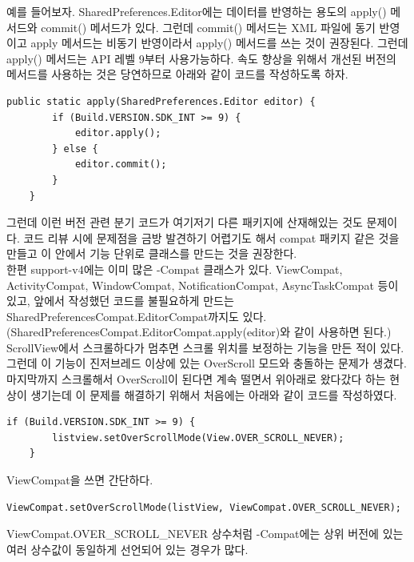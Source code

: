 예를 들어보자. SharedPreferences.Editor에는 데이터를 반영하는 용도의 apply() 메서드와 commit() 메서드가 있다. 그런데 commit() 메서드는 XML 파일에 동기 반영이고 apply 메서드는 비동기 반영이라서 apply() 메서드를 쓰는 것이 권장된다. 그런데 apply() 메서드는 API 레벨 9부터 사용가능하다. 속도 향상을 위해서 개선된 버전의 메서드를 사용하는 것은 당연하므로 아래와 같이 코드를 작성하도록 하자.
\begin{lstlisting}[frame=single]
	public static apply(SharedPreferences.Editor editor) {
		if (Build.VERSION.SDK_INT >= 9) {
   			editor.apply();
   		} else {
   			editor.commit();
   		}
	}
\end{lstlisting}

그런데 이런 버전 관련 분기 코드가 여기저기 다른 패키지에 산재해있는 것도 문제이다. 코드 리뷰 시에 문제점을 금방 발견하기 어렵기도 해서 compat 패키지 같은 것을 만들고 이 안에서 기능 단위로 클래스를 만드는 것을 권장한다.\\

한편 support-v4에는 이미 많은 -Compat 클래스가 있다. ViewCompat, ActivityCompat, WindowCompat, NotificationCompat, AsyncTaskCompat 등이 있고, 앞에서 작성했던 코드를 불필요하게 만드는 SharedPreferencesCompat.EditorCompat까지도 있다.(SharedPreferencesCompat.EditorCompat.apply(editor)와 같이 사용하면 된다.)\\

ScrollView에서 스크롤하다가 멈추면 스크롤 위치를 보정하는 기능을 만든 적이 있다. 그런데 이 기능이 진저브레드 이상에 있는 OverScroll 모드와 충돌하는 문제가 생겼다.
마지막까지 스크롤해서 OverScroll이 된다면 계속 떨면서 위아래로 왔다갔다 하는 현상이 생기는데 이 문제를 해결하기 위해서 처음에는 아래와 같이 코드를 작성하였다.
\begin{lstlisting}[frame=single]
	if (Build.VERSION.SDK_INT >= 9) {
   		listview.setOverScrollMode(View.OVER_SCROLL_NEVER);
	}
\end{lstlisting}
ViewCompat을 쓰면 간단하다.
\begin{lstlisting}[frame=single]
	ViewCompat.setOverScrollMode(listView, ViewCompat.OVER_SCROLL_NEVER);
\end{lstlisting}
ViewCompat.OVER\_SCROLL\_NEVER 상수처럼 -Compat에는 상위 버전에 있는 여러 상수값이 동일하게 선언되어 있는 경우가 많다.\\

